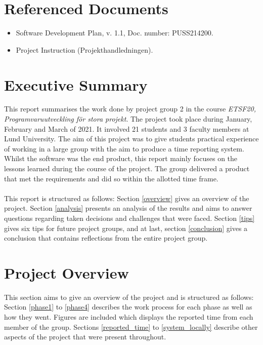 \documentclass{article}
\begin{document}
\section{Referenced Documents \label{refs}}
    \begin{itemize}
        \item Software Development Plan, v. 1.1, Doc. number: PUSS214200.
        \item \label{PH} Project Instruction (Projekthandledningen).
    \end{itemize}

\newpage

\section{Executive Summary}
    This report summarises the work done by project group 2 in the course \emph{ETSF20, Programvaruutveckling för stora projekt}. The project took place during January, February and March of 2021. It involved 21 students and 3 faculty members at Lund University. The aim of this project was to give students practical experience of working in a large group with the aim to produce a time reporting system. Whilst the software was the end product, this report mainly focuses on the lessons learned during the course of the project. The group delivered a product that met the requirements and did so within the allotted time frame.
    \\ \\
    This report is structured as follows: Section \ref{overview} gives an overview of the
    project. Section \ref{analysis} presents an analysis of the results and aims to answer questions regarding taken decisions and challenges that were faced. Section \ref{tips} gives six tips for future project groups, and at last, section \ref{conclusion} gives a conclusion
    that contains reflections from the entire project group.

\section{Project Overview \label{overview}}
    This section aims to give an overview of the project and is structured as follows:
    Section \ref{phase1} to \ref{phase4} describes the work process for each phase as well as how they went. Figures are included which displays the reported time from each member of the group. Sections \ref{reported_time} to \ref{system_locally} describe other aspects of the project that were present throughout.
    
\end{document}
